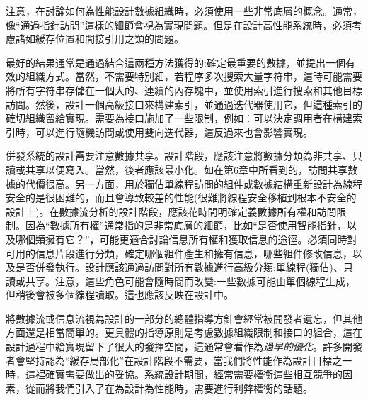 注意，在討論如何為性能設計數據組織時，必須使用一些非常底層的概念。通常，像“通過指針訪問”這樣的細節會視為實現問題。但是在設計高性能系統時，必須考慮諸如緩存位置和間接引用之類的問題。 

最好的結果通常是通過結合這兩種方法獲得的:確定最重要的數據，並提出一個有效的組織方式。當然，不需要特別細，若程序多次搜索大量字符串，這時可能需要將所有字符串存儲在一個大的、連續的內存塊中，並使用索引進行搜索和其他目標訪問。然後，設計一個高級接口來構建索引，並通過迭代器使用它，但這種索引的確切組織留給實現。需要為接口施加了一些限制，例如：可以決定調用者在構建索引時，可以進行隨機訪問或使用雙向迭代器，這反過來也會影響實現。 

併發系統的設計需要注意數據共享。設計階段，應該注意將數據分類為非共享、只讀或共享以便寫入。當然，後者應該最小化。如在第6章中所看到的，訪問共享數據的代價很高。另一方面，用於獨佔單線程訪問的組件或數據結構重新設計為線程安全的是很困難的，而且會導致較差的性能(很難將線程安全移植到根本不安全的設計上)。在數據流分析的設計階段，應該花時間明確定義數據所有權和訪問限制。因為“數據所有權”通常指的是非常底層的細節，比如“是否使用智能指針，以及哪個類擁有它？”，可能更適合討論信息所有權和獲取信息的途徑。必須同時對可用的信息片段進行分類，確定哪個組件產生和擁有信息，哪些組件修改信息，以及是否併發執行。設計應該通過訪問對所有數據進行高級分類:單線程(獨佔)、只讀或共享。注意，這些角色可能會隨時間而改變:一些數據可能由單個線程生成，但稍後會被多個線程讀取。這也應該反映在設計中。 

將數據流或信息流視為設計的一部分的總體指導方針會經常被開發者遺忘，但其他方面還是相當簡單的。更具體的指導原則是考慮數據組織限制和接口的組合，這在設計過程中給實現留下了很大的發揮空間，這通常會看作為\textit{過早的優化}。許多開發者會堅持認為“緩存局部化”在設計階段不需要，當我們將性能作為設計目標之一時，這裡確實需要做出的妥協。系統設計期間，經常需要權衡這些相互競爭的因素，從而將我們引入了在為設計為性能時，需要進行利弊權衡的話題。



































